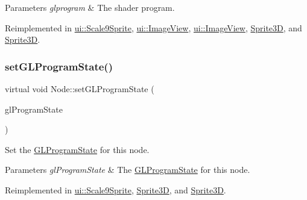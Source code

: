 \begin{DoxyParams}{Parameters}
{\em glprogram} & The shader program. \\
\hline
\end{DoxyParams}


Reimplemented in \hyperlink{classui_1_1Scale9Sprite_add60f59da603e007e2d4794d667f40bb}{ui\+::\+Scale9\+Sprite}, \hyperlink{classui_1_1ImageView_adf4dee6b3cee1d981f2a671dcef2ce7a}{ui\+::\+Image\+View}, \hyperlink{classui_1_1ImageView_a98d9a45e777ea30849634eacf5b58509}{ui\+::\+Image\+View}, \hyperlink{classSprite3D_aa71609d7f3a35a0d86a70f28bafffa9c}{Sprite3D}, and \hyperlink{classSprite3D_addcfa64162310ce40ec097738442af9f}{Sprite3D}.

\mbox{\label{classNode_a3fe706d4e7b601eee9ccc8eb8ecf90c0}} 
\subsubsection{\texorpdfstring{set\+G\+L\+Program\+State()}{setGLProgramState()}\hspace{0.1cm}{\footnotesize\ttfamily [1/2]}}
{\footnotesize\ttfamily virtual void Node\+::set\+G\+L\+Program\+State (\begin{DoxyParamCaption}\item[{\hyperlink{classGLProgramState}{G\+L\+Program\+State} $\ast$}]{gl\+Program\+State }\end{DoxyParamCaption})\hspace{0.3cm}{\ttfamily [virtual]}}

Set the \hyperlink{classGLProgramState}{G\+L\+Program\+State} for this node.


\begin{DoxyParams}{Parameters}
{\em gl\+Program\+State} & The \hyperlink{classGLProgramState}{G\+L\+Program\+State} for this node. \\
\hline
\end{DoxyParams}


Reimplemented in \hyperlink{classui_1_1Scale9Sprite_ac5d1aa898d17b1417f8d6ac5589d0440}{ui\+::\+Scale9\+Sprite}, \hyperlink{classSprite3D_a8bfa814ae2f4584b69dbb776de1c327b}{Sprite3D}, and \hyperlink{classSprite3D_ab9e57d29350dc6886360d433c023b935}{Sprite3D}.

\mbox{\label{classNode_a3fe706d4e7b601eee9ccc8eb8ecf90c0}} 
